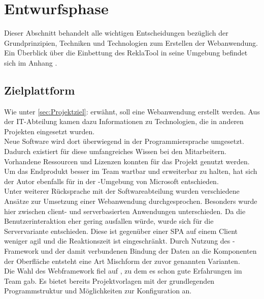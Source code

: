 \section{Entwurfsphase} 
\label{sec:Entwurfsphase}
Dieser Abschnitt behandelt alle wichtigen Entscheidungen bezüglich der Grundprinzipien, Techniken und Technologien zum
Erstellen der Webanwendung. Ein Überblick über die Einbettung des ReklaTool in seine
Umgebung befindet sich im Anhang .

\subsection{Zielplattform}
\label{sec:Zielplattform}
Wie unter \ref{sec:Projektziel}:  erwähnt, 
soll eine Webanwendung erstellt werden. Aus der IT-Abteilung kamen dazu Informationen zu  
Technologien, die in anderen Projekten eingesetzt wurden.\\
Neue Software wird dort überwiegend in der Programmiersprache  umgesetzt. 
Dadurch existiert für diese umfangreiches Wissen bei den Mitarbeitern.
Vorhandene Ressourcen und Lizenzen konnten für das Projekt genutzt werden.
Um das Endprodukt besser im Team wartbar und erweiterbar zu halten, hat sich der Autor 
ebenfalls für  in der -Umgebung von Microsoft entschieden.\\
Unter weiterer Rücksprache mit der Softwareabteilung wurden verschiedene Ansätze zur
Umsetzung einer Webanwendung durchgesprochen. Besonders wurde hier zwischen client- und serverbasierten
Anwendungen unterschieden. Da die Benutzerinteraktion eher gering ausfallen würde, wurde sich
für die Servervariante entschieden. Diese ist gegenüber einer \ac{SPA} auf einem Client weniger agil und die 
Reaktionszeit ist eingeschränkt. Durch Nutzung des -Framework und der damit
verbundenen Bindung der Daten an die Komponenten der Oberfläche entsteht eine Art Mischform der zuvor genannten Varianten.\\
Die Wahl des Webframework fiel auf , zu dem es schon gute Erfahrungen im Team gab.
Es bietet bereits Projektvorlagen mit der grundlegenden Programmstruktur und Möglichkeiten zur
Konfiguration an. 

